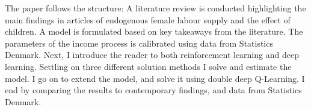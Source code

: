 The paper follows the structure: A literature review is conducted highlighting the main findings in articles of endogenous female labour supply and the effect of children. A model is formulated based on key takeaways from the literature. The parameters of the income process is calibrated using data from Statistics Denmark. Next, I introduce the reader to both reinforcement learning and deep learning. Settling on three different solution methods I solve and estimate the model. I go on to extend the model, and solve it using double deep Q-Learning. I end by comparing the results to contemporary findings, and data from Statistics Denmark.